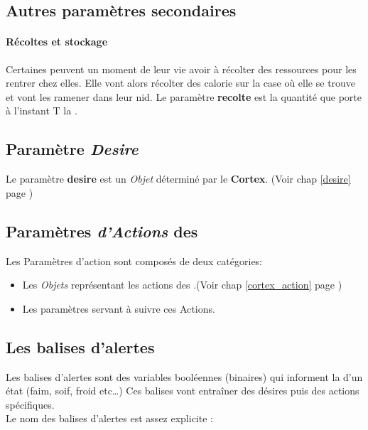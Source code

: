 \documentclass[french]{report}
\begin{document}
\subsection{Autres paramètres secondaires}\label{param_second}

\paragraph{\textbf{Récoltes et stockage}}
Certaines \CoCiX peuvent un moment de leur vie avoir à récolter des ressources pour les rentrer chez elles.
Elle vont alors récolter des calorie sur la case où elle se trouve et vont les ramener dans leur nid. Le paramètre \textbf{recolte} est la quantité que porte à l'instant T la \CoCiX.

\subsection{Paramètre \textit{Desire}}
Le paramètre \textbf{desire} est un \textit{Objet} déterminé par le \textbf{Cortex}. (Voir chap \ref{desire} page \pageref{desire})

\newpage

\subsection{Paramètres \textit{d'Actions} des  \CoCiX}\label{param_action}
Les Paramètres d'action sont composés de deux catégories:
\begin{itemize}
	\item Les \textit{Objets} représentant les actions des \CoCiX.(Voir chap \ref{cortex_action} page \pageref{cortex_action})\\
	\item Les paramètres servant à suivre ces Actions.
\end{itemize}


\subsection{Les balises d'alertes}\label{balise}
Les balises d'alertes sont des variables booléennes (binaires) qui informent la \CoCiX d'un état (faim, soif, froid etc\dots) Ces balises vont entraîner des désires puis des actions spécifiques.\\

Le nom des balises d'alertes est assez explicite : 
\end{document}
